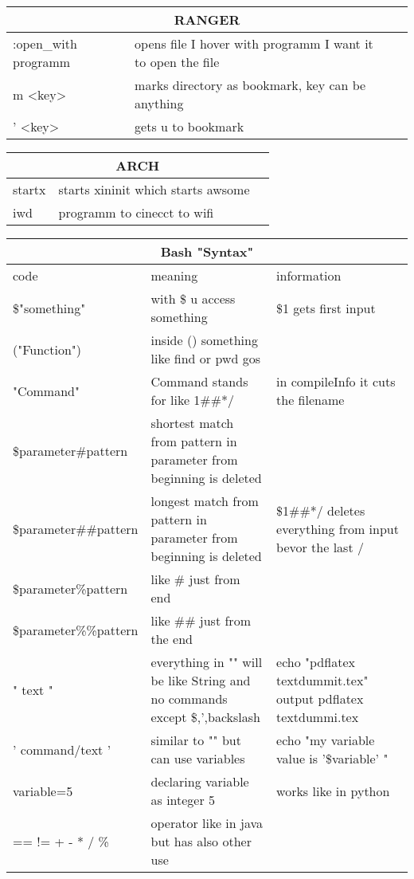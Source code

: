 \documentclass[12pt]{article}
\begin{document}
\begin{tabular}{| p{6.5cm} | p{6.5cm} | p{6.5cm} |}
    \hline
    \multicolumn{3}{|c|}{RANGER} \\
    \hline
    :open\_with programm & opens file I hover with programm I want it to open  the file & \\
    \hline
    m <key> & marks directory as bookmark, key can be anything & \\
    \hline
    ' <key> & gets u to bookmark & \\
    \hline
\end{tabular}

\begin{tabular}{| p{6.5cm} | p{6.5cm} | p{6.5cm} |}
    \hline
    \multicolumn{3}{|c|}{ARCH} \\
    \hline
    startx & starts xininit which starts awsome & \\
    \hline
    iwd & programm to cinecct to wifi & \\
    \hline
\end{tabular}
\newpage

\centering
\begin{tabular}{| p{6.5cm} | p{6.5cm} | p{6.5cm} |}
    \hline
    \multicolumn{3}{|c|}{Bash "Syntax"} \\
    \hline
    code & meaning & information\\
    \hline
    \$"something" & with \$ u access something & \$1 gets first input\\
    \hline
    ("Function") & inside () something like find or pwd gos &\\
    \hline
    {"Command"} & Command stands for like 1\#\#*/ & in compileInfo it cuts the filename \\
    \hline
    \${parameter\#pattern} & shortest match from pattern in parameter from beginning is deleted &\\
    \hline 
    \${parameter\#\#pattern} & longest match from pattern in parameter from beginning is deleted & \${1\#\#*/} deletes everything from input bevor the last / \\
    \hline
    \${parameter\%pattern} & like \# just from end &\\
    \hline 
    \${parameter\%\%pattern} & like \#\# just from the end &\\
    \hline 
    " text " & everything in "" will be like String and no commands except \$,',backslash & echo "pdflatex textdummit.tex" output pdflatex textdummi.tex \\
    \hline
    ' command/text ' & similar to "" but can use variables & echo "my variable value is '\$variable' " \\
    \hline 
    variable=5 & declaring variable as integer 5 & works like in python \\
    \hline 
    == != + - * / \% & operator like in java but has also other use &\\
    \hline 
\end{tabular}
\end{document}
